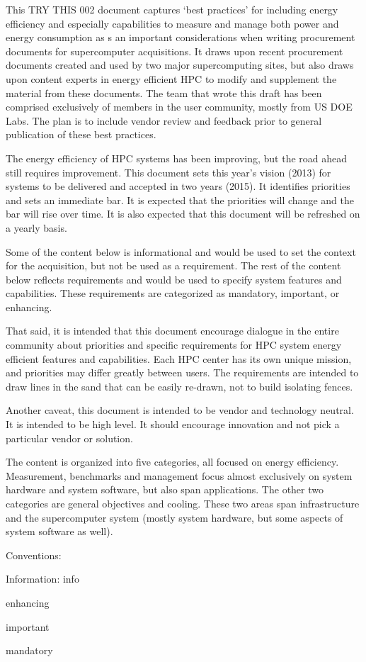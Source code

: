 This TRY THIS 002 document captures ‘best practices’ for including energy efficiency and especially capabilities to measure and manage both power and energy consumption as s an important considerations when writing procurement documents for supercomputer acquisitions.  It draws upon recent procurement documents created and used by two major supercomputing sites, but also draws upon content experts in energy efficient HPC to modify and supplement the material from these documents.  The team that wrote this draft has been comprised exclusively of members in the user community, mostly from US DOE Labs.  The plan is to include vendor review and feedback prior to general publication of these best practices.

The energy efficiency of HPC systems has been improving, but the road ahead still requires improvement.  This document sets this year’s vision (2013) for systems to be delivered and accepted in two years (2015).  It identifies priorities and sets an immediate bar.  It is expected that the priorities will change and the bar will rise over time.  It is also expected that this document will be refreshed on a yearly basis.

Some of the content below is informational and would be used to set the context for the acquisition, but not be used as a requirement.  The rest of the content below reflects requirements and would be used to specify system features and capabilities.  These requirements are categorized as mandatory, important, or enhancing. 


That said, it is intended that this document encourage dialogue in the entire community about priorities and specific requirements for HPC system energy efficient features and capabilities. Each HPC center has its own unique mission, and priorities may differ greatly between users. The requirements are intended to draw lines in the sand that can be easily re-drawn, not to build isolating fences. 

\noindent
Another caveat, this document is intended to be vendor and technology neutral.  It is intended to be high level.  It should encourage innovation and not pick a particular vendor or solution.  
\wl

The content is organized into five categories, all focused on energy efficiency.  Measurement, benchmarks and management focus almost exclusively on system hardware and system software, but also span applications.  The other two categories are general objectives and cooling.  These two areas span infrastructure and the supercomputer system (mostly system hardware, but some aspects of system software as well). 

Conventions:

Information: info

\begin{packed_enum}
\item
enhancing
\item
important
\item
mandatory
\end{packed_enum}

